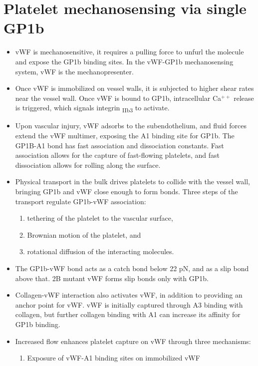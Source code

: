 \documentclass[
10pt, %
letterpaper, %
twocolumn, %
landscape %
]{article}
\newcommand{\inta}[1]{\textalpha\textsubscript{#1}}
\newcommand{\intb}[1]{\textbeta\textsubscript{#1}}
\begin{document}

\section{Platelet mechanosensing via single GP1b}

\begin{itemize}
\item vWF is mechanosensitive, it requires a pulling force to unfurl
  the molecule and expose the GP1b binding sites. In the vWF-GP1b
  mechanosensing system, vWF is the mechanopresenter.
\item Once vWF is immobilized on vessel walls, it is subjected to
  higher shear rates near the vessel wall. Once vWF is bound to GP1b,
  intracellular Ca$^{++}$ release is triggered, which signals integrin
  \inta{IIb}\intb{3} to activate.
\item Upon vascular injury, vWF adsorbs to the subendothelium, and
  fluid forces extend the vWF multimer, exposing the A1 binding site
  for GP1b. The GP1B-A1 bond has fast association and dissociation
  constants. Fast association allows for the capture of fast-flowing
  platelets, and fast dissociation allows for rolling along the
  surface. 
\item Physical transport in the bulk drives platelets to collide with
  the vessel wall, bringing GP1b and vWF close enough to form
  bonds. Three steps of the transport regulate GP1b-vWF association:
  \begin{enumerate}
  \item tethering of the platelet to the vascular surface,
  \item Brownian motion of the platelet, and
  \item rotational diffusion of the interacting molecules.
  \end{enumerate}
\item The GP1b-vWF bond acts as a catch bond below 22 pN, and as a
  slip bond above that. 2B mutant vWF forms slip bonds only with
  GP1b. 
\item Collagen-vWF interaction also activates vWF, in addition to
  providing an anchor point for vWF. vWF is initially captured through
  A3 binding with collagen, but further collagen binding with A1 can
  increase its affinity for GP1b binding.
\item Increased flow enhances platelet capture on vWF through three
  mechanisms:
  \begin{enumerate}
  \item Exposure of vWF-A1 binding sites on immobilized vWF

\end{enumerate}
\end{itemize}
\end{document}
